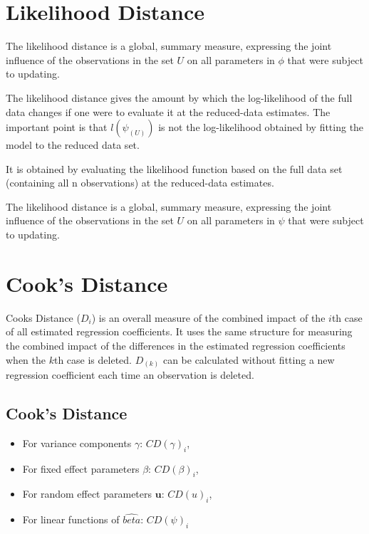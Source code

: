 \documentclass[12pt, a4paper]{report}
\theoremstyle{plain}
\theoremstyle{definition}
\theoremstyle{remark}
\begin{document}

\section{Likelihood Distance} %
The  likelihood distance is a global, summary measure, expressing the joint influence of the observations in the set $U$ on all parameters in $\phi$  that were subject to updating.

The likelihood distance gives the amount by which the log-likelihood of the full data changes if one were
to evaluate it at the reduced-data estimates. The important point is that $l(\psi_{(U)})$ is not the log-likelihood
obtained by fitting the model to the reduced data set.

It is obtained by evaluating the likelihood function based on the full data set (containing all n observations) at the reduced-data estimates.

The likelihood distance is a global, summary measure, expressing the joint influence of the observations in
the set $U$ on all parameters in $\psi$  that were subject to updating.










\section{Cook's Distance}
Cooks Distance ($D_{i}$) is an overall measure of the combined impact of the $i$th case of all estimated regression coefficients. It uses the same structure for measuring the combined impact of the differences in the estimated regression coefficients when the $k$th case is deleted. $D_{(k)}$ can be calculated without fitting
a new regression coefficient each time an observation is deleted.



\subsection{Cook's Distance}
\begin{itemize}
	\item For variance components $\gamma$: $CD(\gamma)_i$,
	\item For fixed effect parameters $\beta$: $CD(\beta)_i$,
	\item For random effect parameters $\boldsymbol{u}$: $CD(u)_i$,
	\item For linear functions of $\hat{beta}$: $CD(\psi)_i$
\end{itemize}
\end{document}
